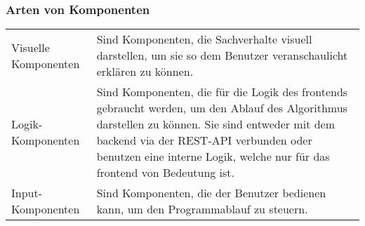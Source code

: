 \documentclass[a4paper,10.2pt,pdftex]{scrartcl}%
\begin{document}
\subsubsection{Arten von Komponenten}
\begin{tabularx}{\textwidth}{p{3cm}p{11cm}} 
Visuelle Komponenten &  Sind Komponenten, die Sachverhalte visuell darstellen, um sie so dem Benutzer veranschaulicht erklären zu können. \\
Logik-Komponenten & Sind Komponenten, die für die Logik des frontends gebraucht werden, um den Ablauf des Algorithmus darstellen zu können. Sie sind entweder mit dem backend via der REST-API verbunden oder benutzen eine interne Logik, welche nur für das frontend von Bedeutung ist. \\
Input-Komponenten & Sind Komponenten, die der Benutzer bedienen kann, um den Programmablauf zu steuern.
\end{tabularx}
\end{document}
